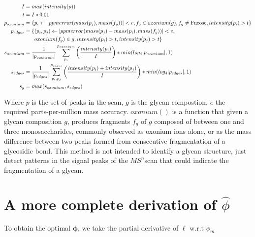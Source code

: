 \documentclass{article}
\newcommand{\msn}[0]{$MS^n$}
\begin{document}
    \begin{align}
        I &= max(intensity(p)) \\
        t &= I * 0.01 \\
        p_{oxonium} &= \{p_i \leftarrow |ppmerror(mass(p_j), mass(f_g))| < e,
                         f_g \in oxonium(g), f_g \ne \text{Fucose}, intensity(p_i) > t\}\\
        p_{edges} &= \{(p_i, p_j) \leftarrow |ppmerror(mass(p_j) - mass(p_i), mass(f_g))| < e,\\
                  &\phantom{{}=1} oxonium(f_g) \in g , intensity(p_i) > t, intensity(p_j) > t\} \notag\\
        s_{oxonium} &= \frac{1}{|p_{oxonium}|}\sum_{p_i}^{p_{oxonium}}{
                \left(\frac{intensity(p_i)}{I}\right)
            } * min(log_4|p_{oxonium}|, 1)\\
        s_{edges} &= \frac{1}{|p_{edges}|}\sum_{p_i, p_j}^{p_{edges}}{
                \left(\frac{intensity(p_i) + intensity(p_j)}{I}\right)
            } * min(log_4|p_{edges}|, 1)\\
        s_g &= max(s_{oxonium}, s_{edges})\\
    \end{align}

    Where $p$ is the set of peaks in the scan, $g$ is the glycan compostion, $e$ the
    required parts-per-million mass accuracy. $oxonium()$ is a function that given
    a glycan composition $g$, produces fragments $f_g$ of $g$ composed of between one
    and three monosaccharides, commonly observed as oxonium ions alone, or as the mass
    difference between two peaks formed from consecutive fragmentation of a glycosidic
    bond. This method is not intended to identify a glycan structure, just detect patterns in
    the signal peaks of the \msn scan that could indicate the fragmentation of a glycan.

\section{A more complete derivation of ${\hat \phi}$}\label{sec:phi_hat_derivation}

    To obtain the optimal $\mathbf{\phi}$, we take the partial
        derivative of $\ell$ w.r.t $\phi_m$
\end{document}
